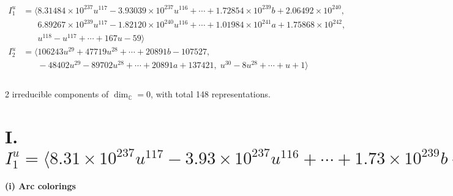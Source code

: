 \documentclass[1p]{elsarticle_modified}
\theoremstyle{definition}
\begin{document}
\begin{align*}
I^u_{1}&=\langle 
8.31484\times10^{237} u^{117}-3.93039\times10^{237} u^{116}+\cdots+1.72854\times10^{239} b+2.06492\times10^{240},\\
\phantom{I^u_{1}}&\phantom{= \langle  }6.89267\times10^{239} u^{117}-1.82120\times10^{240} u^{116}+\cdots+1.01984\times10^{241} a+1.75868\times10^{242},\\
\phantom{I^u_{1}}&\phantom{= \langle  }u^{118}- u^{117}+\cdots+167 u-59\rangle \\
I^u_{2}&=\langle 
106243 u^{29}+47719 u^{28}+\cdots+20891 b-107527,\\
\phantom{I^u_{2}}&\phantom{= \langle  }-48402 u^{29}-89702 u^{28}+\cdots+20891 a+137421,\;u^{30}-8 u^{28}+\cdots+u+1\rangle \\
\\
\end{align*}
\raggedright * 2 irreducible components of $\dim_{\mathbb{C}}=0$, with total 148 representations.\\
\newpage
\renewcommand{\arraystretch}{1}
\centering \section*{I. $I^u_{1}= \langle 8.31\times10^{237} u^{117}-3.93\times10^{237} u^{116}+\cdots+1.73\times10^{239} b+2.06\times10^{240},\;6.89\times10^{239} u^{117}-1.82\times10^{240} u^{116}+\cdots+1.02\times10^{241} a+1.76\times10^{242},\;u^{118}- u^{117}+\cdots+167 u-59 \rangle$}
\flushleft \textbf{(i) Arc colorings}\\
\end{document}

